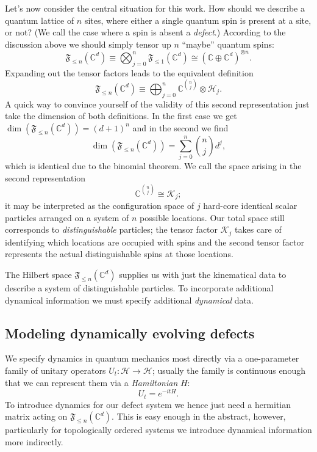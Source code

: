 \documentclass[aps,prb,twocolumn,superscriptaddress,noshowkeys]{revtex4-2}  %
\theoremstyle{plain}%
\theoremstyle{definition}
\theoremstyle{remark}
\begin{document}
Let's now consider the central situation for this work. How should we describe a quantum lattice of $n$ sites, where either a single quantum spin is present at a site, or not? (We call the case where a spin is absent a \emph{defect}.) According to the discussion above we should simply tensor up $n$ ``maybe'' quantum spins:
\begin{equation}
\mathfrak{F}_{\le n}(\mathbb{C}^d) \equiv \bigotimes_{j=0}^n \mathfrak{F}_{\le 1}(\mathbb{C}^d) \cong (\mathbb{C}\oplus \mathbb{C}^d)^{\otimes n}.
\end{equation}
Expanding out the tensor factors leads to the equivalent definition
\begin{equation}
\mathfrak{F}_{\le n}(\mathbb{C}^d) \equiv \bigoplus_{j=0}^n \mathbb{C}^{\binom{n}{j}}\otimes \mathcal{H}_j.
\end{equation}
A quick way to convince yourself of the validity of this second representation just take the dimension of both definitions. In the first case we get $\dim(\mathfrak{F}_{\le n}(\mathbb{C}^d)) = (d+1)^n$ and in the second we find
\begin{equation}
\dim(\mathfrak{F}_{\le n}(\mathbb{C}^d)) = \sum_{j=0}^n \binom{n}{j} d^j,
\end{equation}
which is identical due to the binomial theorem. We call the space arising in the second representation
\begin{equation}
\mathbb{C}^{\binom{n}{j}} \cong \mathcal{K}_{j};
\end{equation}
it may be interpreted as the configuration space of $j$ hard-core identical scalar particles arranged on a system of $n$ possible locations. Our total space still corresponds to \emph{distinguishable} particles; the tensor factor $\mathcal{K}_j$ takes care of identifying which locations are occupied with spins and the second tensor factor represents the actual distinguishable spins at those locations.

The Hilbert space $\mathfrak{F}_{\le n}(\mathbb{C}^d)$ supplies us with just the kinematical data to describe a system of distinguishable particles. To incorporate additional dynamical information we must specify additional \emph{dynamical} data.

\subsection{Modeling dynamically evolving defects}
\label{Intro_dynamics}

We specify dynamics in quantum mechanics most directly via a one-parameter family of unitary operators $U_t:\mathcal{H}\rightarrow\mathcal{H}$; usually the family is continuous enough that we can represent them via a \emph{Hamiltonian} $H$:
\begin{equation}
U_t = e^{-it H}.
\end{equation}
To introduce dynamics for our defect system we hence just need a hermitian matrix acting on $\mathfrak{F}_{\le n}(\mathbb{C}^d)$. This is easy enough in the abstract, however, particularly for topologically ordered systems we introduce dynamical information more indirectly.
\end{document}
